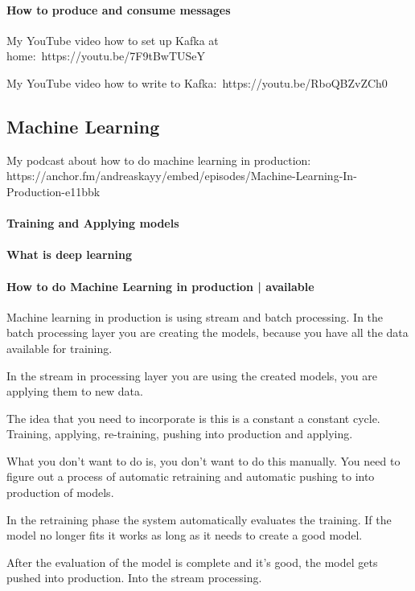 \documentclass[12pt]{scrartcl} %
\begin{document}
\paragraph{How to produce and consume messages}

My YouTube video how to set up Kafka at home: https://youtu.be/7F9tBwTUSeY

My YouTube video how to write to Kafka: https://youtu.be/RboQBZvZCh0

\subsection{Machine Learning}
My podcast about how to do machine learning in production: https://anchor.fm/andreaskayy/embed/episodes/Machine-Learning-In-Production-e11bbk

\paragraph{Training and Applying models}
\paragraph{What is deep learning}
\paragraph{How to do Machine Learning in production | available}
Machine learning in production is using stream and batch processing. In the batch processing layer you are creating the models, because you have all the data available for training.

In the stream in processing layer you are using the created models, you are applying them to new data.

The idea that you need to incorporate is this is a constant a constant cycle. Training, applying, re-training, pushing into production and applying.

What you don’t want to do is, you don’t want to do this manually. You need to figure out a process of automatic retraining and automatic pushing to into production of models.

In the retraining phase the system automatically evaluates the training. If the model no longer fits it works as long as it needs to create a good model.

After the evaluation of the model is complete and it’s good, the model gets pushed into production. Into the stream processing.
\end{document}
